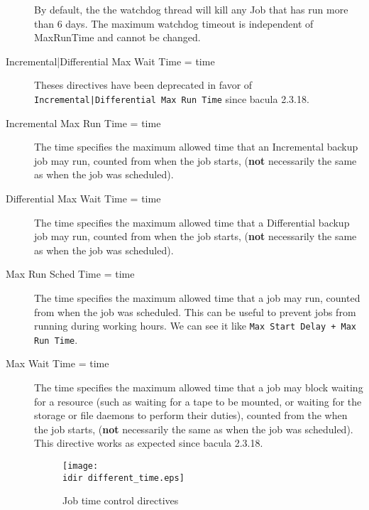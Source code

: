 \begin{description}
   By default, the the watchdog thread will kill any Job that has run more
   than 6 days.  The maximum watchdog timeout is independent of MaxRunTime
   and cannot be changed.


\item [Incremental|Differential Max Wait Time = \lt{}time\gt{}]
    Theses directives have been deprecated in favor of
    \texttt{Incremental|Differential Max Run Time} since bacula 2.3.18.

\item [Incremental Max Run Time = \lt{}time\gt{}]
The time specifies the maximum allowed time that an Incremental backup job may
run, counted from when the job starts, ({\bf not} necessarily the same as when
the job was scheduled).

\item [Differential Max Wait Time = \lt{}time\gt{}]
The time specifies the maximum allowed time that a Differential backup job may
run, counted from when the job starts, ({\bf not} necessarily the same as when
the job was scheduled).

\item [Max Run Sched Time = \lt{}time\gt{}]

The time specifies the maximum allowed time that a job may run, counted from
when the job was scheduled. This can be useful to prevent jobs from running
during working hours. We can see it like \texttt{Max Start Delay + Max Run
  Time}.

\item [Max Wait Time = \lt{}time\gt{}]
   The time specifies the maximum allowed time that a job may block waiting
   for a resource (such as waiting for a tape to be mounted, or waiting for
   the storage or file daemons to perform their duties), counted from the
   when the job starts, ({\bf not} necessarily the same as when the job was
   scheduled). This directive works as expected since bacula 2.3.18.

\begin{figure}[htbp]
  \centering
  \texttt{[image: \\idir different\_time.eps]}
  \caption{Job time control directives}
  \label{fig:differenttime}
\end{figure}


\end{description}
